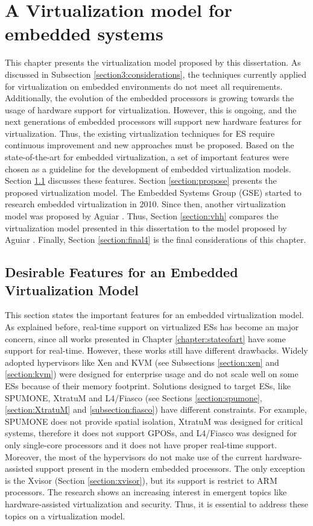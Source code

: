 \chapter{\label{chapter:vtmodel}A Virtualization model for embedded systems}

This chapter presents the virtualization model proposed by this dissertation. As discussed in Subsection \ref{section3:considerations}, the techniques currently applied for virtualization on embedded environments do not meet all requirements. Additionally, the evolution of the embedded processors is growing towards the usage of hardware support for virtualization. However, this is ongoing, and the next generations of embedded processors will support new hardware features for virtualization. Thus, the existing virtualization techniques for ES require continuous improvement and new approaches must be proposed. Based on the state-of-the-art for embedded virtualization, a set of important features were chosen as a guideline for the development of embedded virtualization models. Section \ref{section4:desirable} discusses these features. Section \ref{section:propose} presents the proposed virtualization model. The Embedded Systems Group (GSE) started to research embedded virtualization in 2010. Since then, another virtualization model was proposed by Aguiar \cite{aguiar2013}. Thus, Section \ref{section:vhh} compares the virtualization model presented in this dissertation to the model proposed by Aguiar \cite{aguiar2013}. Finally, Section \ref{section:final4} is the final considerations of this chapter. 

\section {Desirable Features for an Embedded Virtualization Model}
\label{section4:desirable}

This section states the important features for an embedded virtualization model. As explained before, real-time support on virtualized ESs has become an major concern, since all works presented in Chapter \ref{chapter:stateofart} have some support for real-time. However, these works still have different drawbacks. Widely adopted hypervisors like Xen and KVM (see Subsections \ref{section:xen} and \ref{section:kvm}) were designed for enterprise usage and do not scale well on some ESs because of their memory footprint. Solutions designed to target ESs, like SPUMONE, XtratuM and L4/Fiasco (see Sections \ref{section:spumone}, \ref{section:XtratuM} and \ref{subsection:fiasco}) have different constraints. For example,  SPUMONE does not provide spatial isolation, XtratuM was designed for critical systems, therefore it does not support GPOSs, and L4/Fiasco was designed for only single-core processors and it does not have proper real-time support. Moreover, the most of the hypervisors do not make use of the current hardware-assisted support present in the modern embedded processors. The only exception is the Xvisor (Section \ref{section:xvisor}), but its support is restrict to ARM processors. The research shows an increasing interest in emergent topics like hardware-assisted virtualization and security. Thus, it is essential to address these topics on a virtualization model. 


